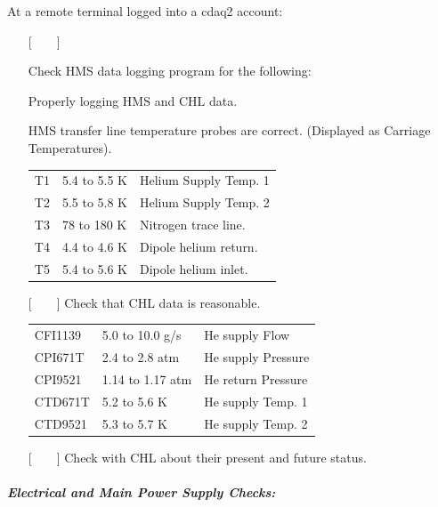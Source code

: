 {At a remote terminal logged into a cdaq2 account:

\begin{itemize}
\item[{[~~~~]}]{Check HMS data logging program for the following:

Properly logging HMS and CHL data.

HMS transfer line temperature probes are correct.  (Displayed as
Carriage Temperatures).}
\begin{center}
  \begin{tabular}{lll}
T1	& 5.4 to 5.5 K	& Helium Supply Temp. 1	\\
T2	& 5.5 to 5.8 K	& Helium Supply Temp. 2	\\
T3	& 78 to 180 K	& Nitrogen  trace line.	\\
T4	& 4.4 to 4.6 K	& Dipole helium return.	\\
T5	& 5.4 to 5.6 K	& Dipole helium inlet.	\\
  \end{tabular}
\end{center}
\item[{[~~~~]}]{Check that CHL data is reasonable.}
\begin{center}
  \begin{tabular}{lll}
CFI1139 & 5.0 to 10.0 g/s & He supply Flow \\
CPI671T & 2.4 to 2.8 atm & He supply Pressure \\
CPI9521 & 1.14 to 1.17 atm & He return Pressure \\
CTD671T & 5.2 to 5.6 K & He supply Temp. 1 \\
CTD9521 & 5.3 to 5.7 K & He supply Temp. 2 \\
\end{tabular}
\end{center}
\item[{[~~~~]}]{Check with CHL about their present and future status.}
\end{itemize}


\subparagraph{Electrical and Main Power Supply Checks:}

}
